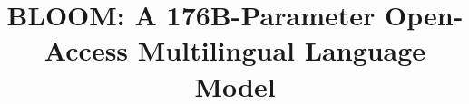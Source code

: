 \documentclass[twoside,11pt]{article}
\begin{document}
\title{BLOOM: A 176B-Parameter Open-Access Multilingual Language Model}

\end{document}
